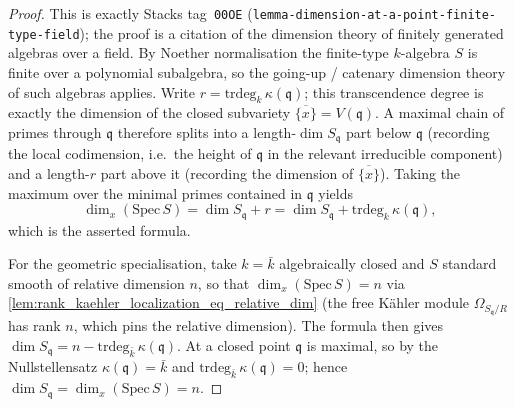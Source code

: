 \begin{proof}
  This is exactly Stacks tag~\texttt{00OE}
  (\texttt{lemma-dimension-at-a-point-finite-type-field}); the proof is a
  citation of the dimension theory of finitely generated algebras over a
  field. By Noether normalisation the finite-type \(k\)-algebra \(S\) is
  finite over a polynomial subalgebra, so the going-up / catenary
  dimension theory of such algebras applies. Write
  \(r = \mathrm{trdeg}_k\,\kappa(\mathfrak q)\); this transcendence
  degree is exactly the dimension of the closed subvariety
  \(\overline{\{x\}} = V(\mathfrak q)\). A maximal chain of primes
  through \(\mathfrak q\) therefore splits into a
  length-\(\dim S_{\mathfrak q}\) part below \(\mathfrak q\) (recording
  the local codimension, i.e.\ the height of \(\mathfrak q\) in the
  relevant irreducible component) and a length-\(r\) part above it
  (recording the dimension of \(\overline{\{x\}}\)). Taking the maximum
  over the minimal primes contained in \(\mathfrak q\) yields
  \[
    \dim_x(\mathrm{Spec}\,S) = \dim S_{\mathfrak q} + r
    = \dim S_{\mathfrak q} + \mathrm{trdeg}_k\,\kappa(\mathfrak q),
  \]
  which is the asserted formula.

  For the geometric specialisation, take
  \(k = \bar k\) algebraically closed and \(S\) standard smooth of
  relative dimension \(n\), so that \(\dim_x(\mathrm{Spec}\,S) = n\) via
  \cref{lem:rank_kaehler_localization_eq_relative_dim} (the free
  K\"ahler module \(\Omega_{S_{\mathfrak q}/R}\) has rank \(n\), which
  pins the relative dimension). The formula then gives
  \(\dim S_{\mathfrak q} = n - \mathrm{trdeg}_{\bar k}\,\kappa(\mathfrak
  q)\). At a closed point \(\mathfrak q\) is maximal, so by the
  Nullstellensatz \(\kappa(\mathfrak q) = \bar k\) and
  \(\mathrm{trdeg}_{\bar k}\,\kappa(\mathfrak q) = 0\); hence
  \(\dim S_{\mathfrak q} = \dim_x(\mathrm{Spec}\,S) = n\).
\end{proof}

